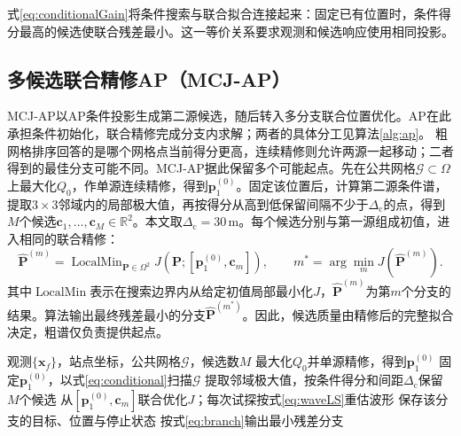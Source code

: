 \documentclass[a4paper,fleqn]{cas-sc}
\numberwithin{equation}{section}
\numberwithin{figure}{section}
\numberwithin{table}{section}
\newcommand{\R}{\mathbb R}
\begin{document}
式\eqref{eq:conditionalGain}将条件搜索与联合拟合连接起来：固定已有位置时，条件得分最高的候选使联合残差最小\cite{ChenHudsonYao2002}。这一等价关系要求观测和候选响应使用相同投影。

\subsection{多候选联合精修AP（MCJ-AP）}\label{sec:mcj}
MCJ-AP以AP条件投影生成第二源候选，随后转入多分支联合位置优化。AP在此承担条件初始化，联合精修完成分支内求解；两者的具体分工见算法\ref{alg:ap}。
粗网格排序回答的是哪个网格点当前得分更高，连续精修则允许两源一起移动；二者得到的最佳分支可能不同。MCJ-AP据此保留多个可能起点。先在公共网格$\mathcal G\subset\Omega$上最大化$Q_0$，作单源连续精修，得到$\bm p_1^{(0)}$。固定该位置后，计算第二源条件谱，提取$3\times3$邻域内的局部极大值，再按得分从高到低保留间隔不少于$\Delta_{\mathrm c}$的点，得到$M$个候选$\bm c_1,\ldots,\bm c_M\in\R^2$。本文取$\Delta_{\mathrm c}=30$\,m。每个候选分别与第一源组成初值，进入相同的联合精修：
\begin{equation}
 \widehat{\bm P}^{(m)}=\operatorname{LocalMin}_{\bm P\in\Omega^2}
 J(\bm P;[\bm p_1^{(0)},\bm c_m]),\qquad
 m^*=\arg\min_m J(\widehat{\bm P}^{(m)}).\label{eq:branch}
\end{equation}
其中$\operatorname{LocalMin}$表示在搜索边界内从给定初值局部最小化$J$，$\widehat{\bm P}^{(m)}$为第$m$个分支的结果。算法输出最终残差最小的分支$\widehat{\bm P}^{(m^*)}$。因此，候选质量由精修后的完整拟合决定，粗谱仅负责提供起点。

\begin{algorithm}[H]
\caption{多候选联合精修AP}\label{alg:ap}
\begin{algorithmic}[1]
\Require 观测$\{\bm x_f\}$，站点坐标，公共网格$\mathcal G$，候选数$M$
\State 最大化$Q_0$并单源精修，得到$\bm p_1^{(0)}$
\State 固定$\bm p_1^{(0)}$，以式\eqref{eq:conditional}扫描$\mathcal G$
\State 提取邻域极大值，按条件得分和间距$\Delta_{\mathrm c}$保留$M$个候选
  \State 从$[\bm p_1^{(0)},\bm c_m]$联合优化$J$；每次试探按式\eqref{eq:waveLS}重估波形
  \State 保存该分支的目标、位置与停止状态
\EndFor
\State 按式\eqref{eq:branch}输出最小残差分支
\end{algorithmic}
\end{algorithm}
\end{document}

